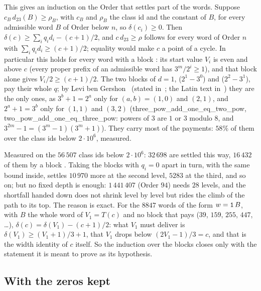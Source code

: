 \documentclass[10pt,a4paper,titlepage]{article}
\newcommand{\lean}[1]{\textsf{#1}}
\begin{document}
This gives an induction on the Order that settles part of the words. Suppose $c_B\,d_{23}(B) \ge
\rho_B$, with $c_B$ and $\rho_B$ the class id and the constant of $B$, for every admissible word $B$ of
Order below $n$, so $\delta(c_i) \ge 0$. Then $\delta(c) \ge \sum_i
q_i d_i - (c+1)/2$, and $c\,d_{23} \ge \rho$ follows for every word of Order $n$ with $\sum_i q_i d_i
\ge (c+1)/2$; equality would make $c$ a point of a cycle. In particular this holds for every word
with a block : its start value $V_i$ is even and above $c$ (every proper prefix of an
admissible word has $3^m/2^i \ge 1$), and that block alone gives $V_i/2 \ge (c+1)/2$. The two
blocks of $d = 1$,  ($2^1 - 3^0$) and  ($2^2 - 3^1$), pay their whole $q$; by Levi
ben Gershon~\cite{LeviBenGershon1343} (stated in~\cite[p.~245]{Simonson2000}; the Latin text in~\cite{Carlebach1910}) they are the only ones, as $3^b + 1 = 2^a$ only for $(a, b) = (1, 0)$
and $(2, 1)$, and $2^a + 1 = 3^b$ only for $(1, 1)$ and $(3, 2)$ (\lean{three\_pow\_add\_one\_eq\_two\_pow},
\lean{two\_pow\_add\_one\_eq\_three\_pow}: powers of $3$ are $1$ or $3$ modulo $8$, and
$3^{2m} - 1 = (3^m - 1)(3^m + 1)$). They carry
most of the payments: $58\%$ of them over the class ids below $2 \cdot 10^6$, measured.

Measured on the $56\,507$ class ids below $2 \cdot 10^6$: $32\,698$ are settled this way,
$16\,432$ of them by a block . Taking the blocks with $q_i = 0$ apart in turn, with the
same bound inside, settles $10\,970$ more at the second level, $5283$ at the third, and so on;
but no fixed depth is enough: $1\,441\,407$ (Order $94$) needs $28$ levels, and the shortfall
handed down does not shrink level by level but rides the climb of the path to its top. The
reason is exact. For the $8847$ words of the form $w = \text{\texttt{1}}\,B$, with $B$ the whole word of
$V_1 = T(c)$ and no block that pays ($39$, $159$, $255$, $447$, \ldots), $\delta(c) = \delta(V_1) -
(c+1)/2$: what $V_1$ must deliver is $\delta(V_1) \ge (V_1+1)/3 + 1$, that $V_1$ drops below $(2V_1-1)/3 = c$,
and that is the width identity of $c$ itself. So the induction over the blocks closes only with
the statement it is meant to prove as its hypothesis.

\subsection*{With the zeros kept}
\end{document}
